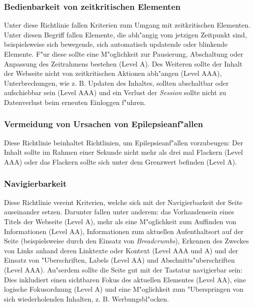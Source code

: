 \documentclass[a4paper,bibtotoc,oneside]{scrbook}
\begin{document}
\subsubsection{Bedienbarkeit von zeitkritischen Elementen}
Unter diese Richtlinie fallen Kriterien zum Umgang mit zeitkritischen Elementen. Unter diesen Begriff fallen Elemente, die abh"angig vom jetzigen Zeitpunkt sind, beispielsweise sich bewegende, sich automatisch updatende oder blinkende Elemente. F"ur diese sollte eine M"oglichkeit zur Pausierung, Abschaltung oder Anpassung des Zeitrahmens bestehen (Level A). Des Weiteren sollte der Inhalt der Webseite nicht von zeitkritischen Aktionen abh"angen (Level AAA), Unterbrechungen, wie z. B. Updaten des Inhaltes, sollten abschaltbar oder aufschiebbar sein (Level AAA) und ein Verlust der \emph{Session} sollte nicht zu Datenverlust beim erneuten Einloggen f"uhren. \cite[Abschnitt 2.2]{wcag2}

\subsubsection{Vermeidung von Ursachen von Epilepsieanf"allen}
Diese Richtlinie beinhaltet Richtlinien, um Epilepsieanf"allen vorzubeugen: Der Inhalt sollte im Rahmen einer Sekunde nicht mehr als drei mal Flackern (Level AAA) oder das Flackern sollte sich unter dem Grenzwert befinden (Level A). \cite[Abschnitt 2.3]{wcag2}

\subsubsection{Navigierbarkeit}
Diese Richtlinie vereint Kriterien, welche sich mit der Navigierbarkeit der Seite auseinander setzen. Darunter fallen unter anderem: das Vorhandensein eines Titels der Webseite (Level A), mehr als eine M"oglichkeit zum Auffinden von Informationen (Level AA), Informationen zum aktuellen Aufenthaltsort auf der Seite (beispielsweise durch den Einsatz von \emph{Breadcrumbs}), Erkennen des Zweckes von Links anhand deren Linktexte oder Kontext (Level AAA und A) und der Einsatz von "Uberschriften, Labels (Level AA) und Abschnitts"uberschriften (Level AAA). Au"serdem sollte die Seite gut mit der Tastatur navigierbar sein: Dies inkludiert einen sichtbaren Fokus des aktuellen Elementes (Level AA), eine logische Fokusordnung (Level A) und eine M"oglichkeit zum "Uberspringen von sich wiederholenden Inhalten, z. B. Werbungsbl"ocken. \cite[Abschnitt 2.4]{wcag2}
\end{document}
